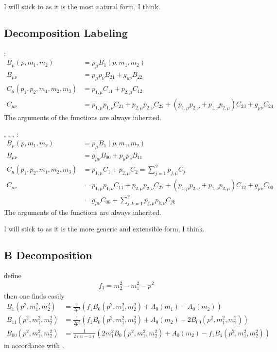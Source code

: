I will stick to \cite{Bojak:2000eu} as it is the most natural form, I think.

\subsection{Decomposition Labeling}
\cite{Passarino:1978jh,Bojak:2000eu}:
\begin{align}
B_\mu(p,m_1,m_2) &=p_{\mu} B_1(p,m_1,m_2)\\
B_{\mu\nu} &= p_{\mu}p_{\nu} B_{21}+g_{\mu\nu}B_{22}\\
C_{\mu}(p_1,p_2,m_1,m_2,m_3) &= p_{1,\mu}C_{11}+p_{2,\mu}C_{12}\\
C_{\mu\nu} &= p_{1,\mu}p_{1,\nu}C_{21}+p_{2,\mu}p_{2,\nu}C_{22}+(p_{1,\mu}p_{2,\nu}+p_{1,\nu}p_{2,\mu})C_{23}+g_{\mu\nu}C_{24}
\end{align}
The arguments of the functions are always inherited.

\HEPMath, \FeynCalc, \LoopTools, \cite{Ellis:2011cr}:
\begin{align}
B_\mu(p,m_1,m_2) &=p_{\mu} B_1(p,m_1,m_2)\\
B_{\mu\nu} &= g_{\mu\nu}B_{00}+p_{\mu}p_{\nu} B_{11}\\
C_{\mu}(p_1,p_2,m_1,m_2,m_3) &= p_{1,\mu}C_{1}+p_{2,\mu}C_{2}=\sum_{j=1}^2 p_{j,\mu}C_{j}\\
C_{\mu\nu} &= p_{1,\mu}p_{1,\nu}C_{11}+p_{2,\mu}p_{2,\nu}C_{22}+(p_{1,\mu}p_{2,\nu}+p_{1,\nu}p_{2,\mu})C_{12}+g_{\mu\nu}C_{00}\\
 &=g_{\mu\nu}C_{00} + \sum_{j,k=1}^2 p_{j,\mu}p_{k,\nu}C_{jk}
\end{align}
The arguments of the functions are always inherited.

I will stick to \HEPMath{} as it is the more generic and extensible form, I think.

\subsection{B Decomposition}
define
\begin{align}
f_1 = m_2^2-m_1^2-p^2
\end{align}
then one finds easily
\begin{align}
B_1(p^2,m_1^2,m_2^2) &= \frac 1 {2p^2}\left(f_1B_0(p^2,m_1^2,m_2^2)+A_0(m_1)-A_0(m_2)\right) \label{eq:B1}\\
B_{11}(p^2,m_1^2,m_2^2) &= \frac 1 {2p^2}\left(f_1B_0(p^2,m_1^2,m_2^2)+A_0(m_2)-2B_{00}(p^2,m_1^2,m_2^2)\right)\\
B_{00}(p^2,m_1^2,m_2^2) &= \frac 1 {2(n-1)}\left(2m_1^2B_0(p^2,m_1^2,m_2^2)+A_0(m_2)-f_1B_1(p^2,m_1^2,m_2^2)\right)
\end{align}
in accordance with \cite{Bojak:2000eu,Ellis:2011cr}.

